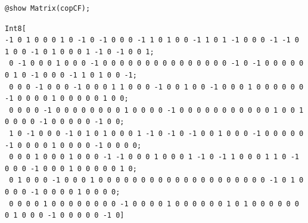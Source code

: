 \documentclass{juliacon}
\begin{document}
{\footnotesize\begin{verbatim}
@show Matrix(copCF);
\end{verbatim}}\vspace{-2mm}
{\tiny\begin{verbatim}
Int8[
-1 0 1 0 0 0 1 0 -1 0 -1 0 0 0 -1 1 0 1 0 0 -1 1 0 1 -1 0 0 0 -1 -1 0 1 0 0 -1 0 1 0 0 0 1 -1 0 -1 0 0 1;
 0 -1 0 0 0 1 0 0 0 -1 0 0 0 0 0 0 0 0 0 0 0 0 0 0 0 -1 0 -1 0 0 0 0 0 0 1 0 -1 0 0 0 -1 1 0 1 0 0 -1;
 0 0 0 -1 0 0 0 -1 0 0 0 1 1 0 0 0 -1 0 0 1 0 0 -1 0 0 0 1 0 0 0 0 0 0 -1 0 0 0 0 1 0 0 0 0 0 1 0 0;
 0 0 0 0 -1 0 0 0 0 0 0 0 0 1 0 0 0 0 -1 0 0 0 0 0 0 0 0 0 0 0 1 0 0 1 0 0 0 0 -1 0 0 0 0 0 -1 0 0;
 1 0 -1 0 0 0 -1 0 1 0 1 0 0 0 1 -1 0 -1 0 -1 0 0 1 0 0 0 -1 0 0 0 0 0 -1 0 0 0 0 1 0 0 0 0 -1 0 0 0 0;
 0 0 0 1 0 0 0 1 0 0 0 -1 -1 0 0 0 1 0 0 0 1 -1 0 -1 1 0 0 0 1 1 0 -1 0 0 0 -1 0 0 0 1 0 0 0 0 0 1 0;
 0 1 0 0 0 -1 0 0 0 1 0 0 0 0 0 0 0 0 0 0 0 0 0 0 0 0 0 0 0 0 -1 0 1 0 0 0 0 -1 0 0 0 0 1 0 0 0 0;
 0 0 0 0 1 0 0 0 0 0 0 0 0 -1 0 0 0 0 1 0 0 0 0 0 0 1 0 1 0 0 0 0 0 0 0 1 0 0 0 -1 0 0 0 0 0 -1 0]
\end{verbatim}}
\end{document}
